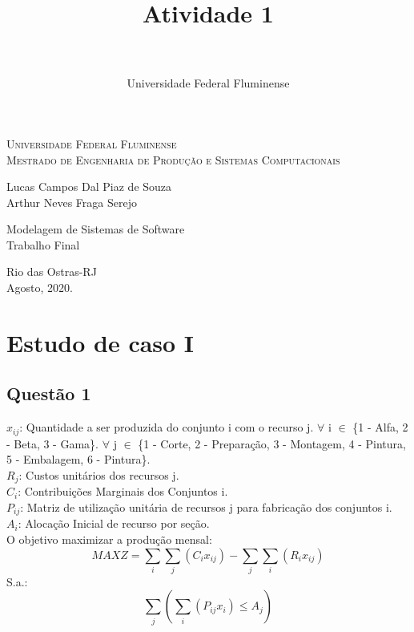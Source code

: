 \documentclass[a4paper,oneside]{article}
\title{Atividade 1}
\author{\\
\\

Universidade Federal Fluminense\\



}
\begin{document}

\begin{titlepage}
  \begin{center}
\Large{\textsc{Universidade Federal Fluminense} \\
           \textsc{Mestrado de Engenharia de Produção e Sistemas Computacionais}
          }
    \par\vfill
    \LARGE{Lucas Campos Dal Piaz de Souza\\Arthur Neves Fraga Serejo}
    \par\vfill
    \LARGE{Modelagem de Sistemas de Software}\\
    \LARGE{Trabalho Final}
    \par\vfill
    \Large{Rio das Ostras-RJ\\Agosto, 2020.}
  \end{center}
\end{titlepage}
\newpage
\tableofcontents
\newpage







\section {Estudo de caso I}
\subsection{Questão 1}
$x_{ij}$: Quantidade a ser produzida do conjunto i com o recurso j. $\forall$ i $\in$ \{1 - Alfa, 2 - Beta, 3 - Gama\}. $\forall$ j $\in$  \{1 - Corte, 2 - Preparação, 3 - Montagem, 4 - Pintura, 5 - Embalagem, 6 - Pintura\}.\\
$R_j$: Custos unitários dos recursos j.
\\
$C_i$: Contribuições Marginais dos Conjuntos i.
\\
$P_{ij}$: Matriz de utilização unitária de recursos j para fabricação dos conjuntos i.
\\
$A_i$: Alocação Inicial de recurso por seção.
\\
O objetivo maximizar a produção mensal:
\begin{equation}
  MAX Z =  \sum_{i} \sum_{j}  (C_{i}x_{ij}) - \sum_{j} \sum_{i}  (R_{i}x_{ij})
\end{equation}
S.a.:
\begin{equation}
    \sum_{j}(\sum_{i} ( P_{ij}x_{i}) \leq  A_{j} )
\end{equation}
\end{document}
